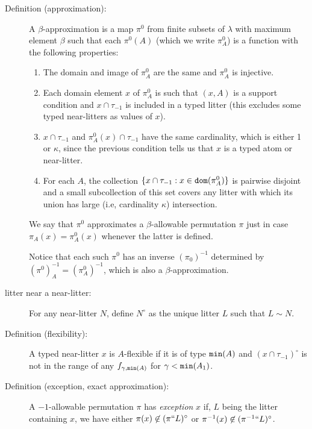 \documentclass[112pt]{article}
\begin{document}
\begin{description}

\item[Definition (approximation):]   A $\beta$-approximation is a map $\pi^0$ from finite subsets of $\lambda$ with maximum element $\beta$ such
that each $\pi^0(A)$ (which we write $\pi^0_A$) is a function with the following properties:

\begin{enumerate}

\item  The domain and image of $\pi^0_A$ are the same and $\pi^0_A$ is injective.

\item Each domain element $x$ of $\pi^0_A$ is such that $(x,A)$ is a support condition and $x \cap \tau_{-1}$ is included in a typed litter (this excludes some typed near-litters as values of $x$).

\item $x \cap \tau_{-1}$ and $\pi^0_A(x) \cap \tau_{-1}$ have the same cardinality, which is either 1 or $\kappa$, since the previous condition tells us that $x$ is a typed atom or near-litter.

\item  For each $A$, the collection $\{x \cap \tau_{-1}: x \in {\tt dom}(\pi^0_A)\}$ is pairwise disjoint  and a small subcollection of this set covers any litter with which its union has large (i.e, cardinality $\kappa$)  intersection.

\end{enumerate}

We say that $\pi^0$ approximates a $\beta$-allowable permutation $\pi$ just in case $\pi_A(x) = \pi^0_A(x)$ whenever the latter is defined.

Notice that each such $\pi^0$ has an inverse $(\pi_0)^{-1}$ determined by $(\pi^0)^{-1}_A = (\pi^0_A)^{-1}$, which is also a $\beta$-approximation.

\item[litter near a near-litter:]  For any near-litter $N$, define $N^\circ$ as the unique litter $L$ such that $L \sim N$.

\item[Definition (flexibility):]  A typed near-litter $x$ is $A$-flexible if it is of type ${\tt min}(A)$ and $(x \cap \tau_{-1})^\circ$ is not in the range of any $f_{\gamma,{\tt min}(A)}$
for $\gamma<{\tt min}(A_1)$.



\item[Definition (exception, exact approximation):]  A $-1$-allowable permutation $\pi$ has {\em exception\/} $x$ if, $L$ being the litter containing $x$,
we have either $\pi(x) \not\in (\pi``L)^\circ$ or $\pi^{-1}(x) \not\in (\pi^{-1}``L)^\circ$.


\end{description}
\end{document}
